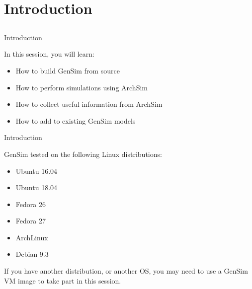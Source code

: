 \section{Introduction}
\subsection{}

\begin{frame}{Introduction}

In this session, you will learn:
\begin{itemize}
\item How to build GenSim from source
\item How to perform simulations using ArchSim
\item How to collect useful information from ArchSim
\item How to add to existing GenSim models
\end{itemize}

\end{frame}


\begin{frame}{Introduction}

GenSim tested on the following Linux distributions:
\begin{itemize}
\item Ubuntu 16.04
\item Ubuntu 18.04
\item Fedora 26
\item Fedora 27
\item ArchLinux
\item Debian 9.3
\end{itemize}

If you have another distribution, or another OS, you may need to use
a GenSim VM image to take part in this session.

\end{frame}
